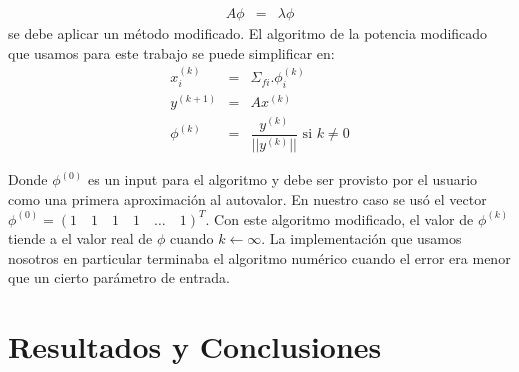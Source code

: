 \documentclass[11pt,a4paper]{emulateapj}
\begin{document}
\begin{eqnarray}
\label{eqn:problemaAutovalores}
A\phi &=& \lambda \phi
\end{eqnarray}
se debe aplicar un método modificado. El algoritmo de la potencia modificado que usamos para este trabajo se puede simplificar en:
\begin{eqnarray}
\label{eqn:algoritmoPotenciaModificado}
x_i^{(k)} &=& \Sigma_{fi}.\phi_i^{(k)} \\
y^{(k+1)} &=& Ax^{(k)}  \\
\phi^{(k)} &=& \dfrac{y^{(k)}}{||y^{(k)}||} \text{ si } k \neq 0
\end{eqnarray}

Donde $\phi^{(0)}$ es un input para el algoritmo y debe ser provisto por el usuario como una primera aproximación al autovalor. En nuestro caso se usó
el vector $\phi^{(0)} = (1\quad1\quad1\quad1\quad\dots\quad1)^T$. Con este algoritmo modificado, el valor de $\phi^{(k)}$ tiende a el valor real de $\phi$
cuando $k\leftarrow\infty$. La implementación que usamos nosotros en particular terminaba el algoritmo numérico cuando el error era menor que un cierto
parámetro de entrada. 
\section{Resultados y Conclusiones}
\label{sec:resultadosyconclusiones}
\end{document}
